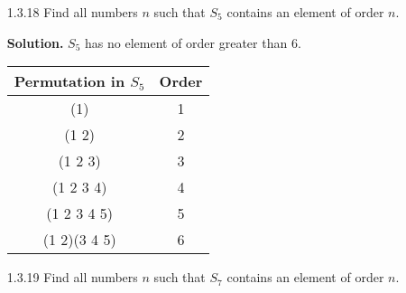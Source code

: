 \begin{enumerate}
      \textbf{Proof.} Let $n \ge 4$. To form a product of two disjoint 2-cycles 
      in $S_n$, we first select four elements in $\{1, 2, \ldots, n\}$, say $a$, 
      $b$, $c$, and $d$. There are exactly three products of two disjoint
      2-cycles in $S_n$ containing these numbers; they are:
      $$(a\;b)(c\;d), (a\;c)(b\;d), \text{ and } (a\;d)(b\;c).$$
      Thus, there are $\binom{n}{4} \cdot 3$ ways of forming a product of two
      disjoint 2-cycles in $S_n$, and the proof is done because
      $$\binom{n}{4} \cdot 3 = \frac{n(n-1)(n-2)(n-3)}{8}.$$ \qed
   \item[1.3.18]  Find all numbers $n$ such that $S_5$ contains an element of
                  order $n$.

      \textbf{Solution.} $S_5$ has no element of order greater than 6.
      \begin{center}
         \begin{tabular}{@{}|c|c|@{}}   \hline
            Permutation in $S_5$    & Order   \\ \hline
            (1)          & 1       \\ \hline
            (1 2)        & 2       \\ \hline 
            (1 2 3)      & 3       \\ \hline
            (1 2 3 4)    & 4       \\ \hline
            (1 2 3 4 5)  & 5       \\ \hline
            (1 2)(3 4 5) & 6       \\ \hline
         \end{tabular}
      \end{center}
   \item[1.3.19]  Find all numbers $n$ such that $S_7$ contains an element of
                  order $n$.


\end{enumerate}
